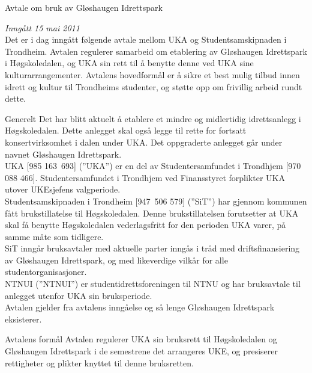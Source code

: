 \begin{instruks*}{Avtale om bruk av Gløshaugen Idrettspark}

\emph{Inngått 15 mai 2011}\\



Det er i dag inngått følgende avtale mellom UKA og Studentsamskipnaden i Trondheim. Avtalen regulerer samarbeid om etablering av Gløshaugen Idrettspark i Høgskoledalen, og UKA sin rett til å benytte denne ved UKA sine kulturarrangementer. Avtalens hovedformål er å sikre et best mulig tilbud innen idrett og kultur til Trondheims studenter, og støtte opp om frivillig arbeid rundt dette.


\begin{instruksledd}{Generelt} 
Det har blitt aktuelt å etablere et mindre og midlertidig idrettsanlegg i Høgskoledalen. Dette anlegget skal også legge til rette for fortsatt konsertvirksomhet i dalen under UKA.  Det oppgraderte anlegget går under navnet Gløshaugen Idrettspark.\\ 

UKA [985 163 693] (”UKA”) er en del av Studentersamfundet i Trondhjem [970 088 466]. Studentersamfundet i Trondhjem ved Finansstyret forplikter UKA utover UKEsjefens valgperiode.\\

Studentsamskipnaden i Trondheim [947 506 579] (”SiT”) har gjennom kommunen fått brukstillatelse til Høgskoledalen. Denne brukstillatelsen forutsetter at UKA skal få benytte Høgskoledalen vederlagsfritt for den perioden UKA varer, på samme måte som tidligere.\\  

SiT inngår bruksavtaler med aktuelle parter inngås i tråd med driftsfinansiering av Gløshaugen Idrettspark, og med likeverdige vilkår for alle studentorganisasjoner.\\

NTNUI (”NTNUI”) er studentidrettsforeningen til NTNU og har bruksavtale til anlegget utenfor UKA sin bruksperiode.\\

Avtalen gjelder fra avtalens inngåelse og så lenge Gløshaugen Idrettspark eksisterer.\\
\end{instruksledd}
 
\begin{instruksledd}{Avtalens formål}
Avtalen regulerer UKA sin bruksrett til Høgskoledalen og Gløshaugen Idrettspark i de semestrene det arrangeres UKE, og presiserer rettigheter og plikter knyttet til denne bruksretten.\\
\end{instruksledd}
 

\end{instruks*}
